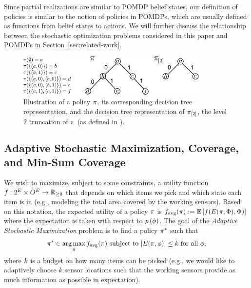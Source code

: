 Since partial realizations are similar to POMDP belief states, our definition of policies is similar to the notion of policies in POMDPs, which are usually defined as functions from belief states to actions. We will further discuss the relationship between the stochastic optimization problems considered in this paper and POMDPs in Section~\ref{sec:related-work}.

  \begin{figure} 
 \centering 
 \includegraphics[width=0.85\textwidth]{figs/policyAsTree}
 \caption{Illustration of a policy $\pi$, its corresponding
   decision tree representation, and the decision tree representation
   of $ \pi_{[{2}]} $, the level $2$ truncation of $\pi$
   (as defined in ).}
%
\label{fig:policyastree}
 \end{figure}



\subsection{Adaptive Stochastic Maximization, Coverage, and Min-Sum Coverage} We wish to maximize, subject to some constraints, a utility function $f :2^{E} \times O^{E} \to \mathbb{R}_{\ge 0}$ that depends on which items we pick and which state each item is in (e.g., modeling the total area covered by the working sensors).   
Based on this notation, the expected utility of a policy $\pi$ is
$f_{\text{avg}}(\pi) := \mathbb{E}\left[f(E({\pi}, {{\color{black}{\ensuremath{\Phi}}}}),
  {\color{black}{\ensuremath{\Phi}}})\right]$ where the expectation is taken with respect to ${\color{black}{\ensuremath{p \left( {{\color{black}{\ensuremath{\phi}}}} \right) }}}$.
The goal of the \emph{Adaptive Stochastic Maximization} problem is to 
find a policy $\pi^{*}$ such that 
\begin{equation}\pi^{*}\in\mathop{\rm arg\,max}_{\pi} f_{\text{avg}}(\pi) \text{
    subject to } |E({\pi}, {{\color{black}{\ensuremath{\phi}}}})|\leq k\text{ for all }{\color{black}{\ensuremath{\phi}}}, 
\label{eq:stochmax}\end{equation} where $k$ is a budget on how many items can be picked (e.g., we would like to adaptively choose $k$ sensor locations such that the working sensors provide as much information as possible in expectation).

